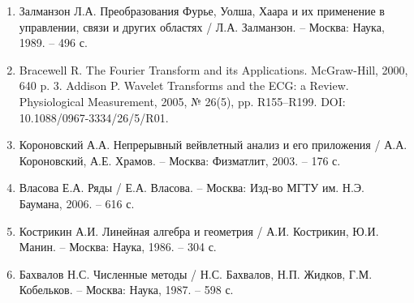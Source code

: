 \documentclass[11pt, oneside, a4paper]{article}
\begin{document}
\begin{enumerate} 
\item Залманзон Л.А. Преобразования Фурье, Уолша, Хаара и их применение в управлении, связи и других областях / Л.А. Залманзон. – Москва: Наука, 1989. – 496 с.
\item Bracewell R. The Fourier Transform and its Applications. McGraw-Hill, 2000, 640 p.
3. Addison P. Wavelet Transforms and the ECG: a Review. Physiological Measurement, 2005, № 26(5), pp. R155–R199. DOI: 10.1088/0967-3334/26/5/R01.
\item Короновский А.А. Непрерывный вейвлетный анализ и его приложения / А.А. Короновский, А.Е. Храмов. – Москва: Физматлит, 2003. – 176 с.
\item Власова Е.А. Ряды / Е.А. Власова. – Москва: Изд-во МГТУ им. Н.Э. Баумана, 2006. – 616 с.
\item Кострикин А.И. Линейная алгебра и геометрия / А.И. Кострикин, Ю.И. Манин. – Москва: Наука, 1986. – 304 с.
\item Бахвалов Н.С. Численные методы / Н.С. Бахвалов, Н.П. Жидков, Г.М. Кобельков. – Москва: Наука, 1987. – 598 с.
\end{enumerate}
\end{document}
